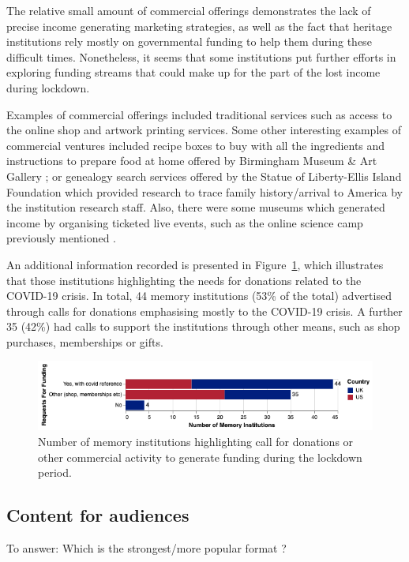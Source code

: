 \documentclass{egpubl}
\begin{document}
The relative small amount of commercial offerings demonstrates the lack of precise income generating marketing strategies, as well as the fact that heritage institutions rely mostly on governmental funding to help them during these difficult times. Nonetheless, it seems that some institutions put further efforts in exploring funding streams that could make up for the part of the lost income during lockdown.


Examples of commercial offerings included traditional services such as access to the online shop and artwork printing services. Some other interesting examples of commercial ventures included recipe boxes to buy with all the ingredients and instructions to prepare food at home offered by Birmingham Museum \& Art Gallery ; or genealogy search services offered by the Statue of Liberty-Ellis Island Foundation  which provided research to trace family history/arrival to America by the institution research staff. Also, there were some museums which generated income by organising ticketed live events, such as the online science camp previously mentioned \cite{fieldmuseum}. 

An additional information recorded is presented in Figure~\ref{fig:funding}, which illustrates that those institutions highlighting the needs for donations related to the COVID-19 crisis. In total, 44 memory institutions (53\% of the total) advertised through calls for donations emphasising mostly to the COVID-19 crisis. A further 35 (42\%) had calls to support the institutions through other means, such as shop purchases, memberships or gifts.

\begin{figure}[h]
  \centering
  \includegraphics[width=\linewidth]{images/funding.png}
  \caption{\label{fig:funding}
            Number of memory institutions highlighting call for donations or other commercial activity to generate funding during the lockdown period.}
\end{figure}


\subsection{Content for audiences}
\color{red}To answer: Which is the strongest/more popular format ?\color{black}
\end{document}
